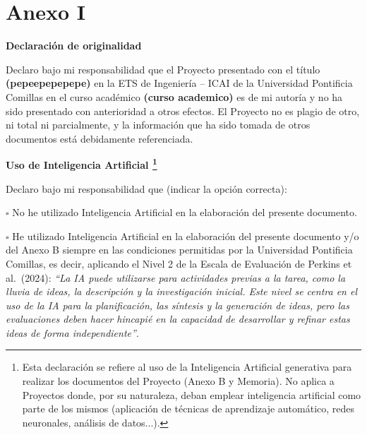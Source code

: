 \cleardoublepage
\chapter*{Anexo I}

\begin{center}
{\Large\bfseries Declaración de originalidad}
\end{center}

\vspace{0.8cm}

\noindent
Declaro bajo mi responsabilidad que el Proyecto presentado con el título \textbf{(pepeepepepepe)} en la ETS de Ingeniería -- ICAI de la Universidad Pontificia Comillas en el curso académico \textbf{(curso academico)} es de mi autoría y no ha sido presentado con anterioridad a otros efectos. El Proyecto no es plagio de otro, ni total ni parcialmente, y la información que ha sido tomada de otros documentos está debidamente referenciada.

\vspace{1.2cm}

\begin{center}
{\Large\bfseries Uso de Inteligencia Artificial \footnote{Esta declaración se refiere al uso de la Inteligencia Artificial generativa para realizar los documentos del Proyecto (Anexo B y Memoria). No aplica a Proyectos donde, por su naturaleza, deban emplear inteligencia artificial como parte de los mismos (aplicación de técnicas de aprendizaje automático, redes neuronales, análisis de datos...).}}
\end{center}

\vspace{0.8cm}

\noindent
Declaro bajo mi responsabilidad que (indicar la opción correcta):

\vspace{0.6cm}

\noindent
$\square$ \quad No he utilizado Inteligencia Artificial en la elaboración del presente documento.

\vspace{0.6cm}

\noindent
$\square$ \quad He utilizado Inteligencia Artificial en la elaboración del presente documento y/o del Anexo B siempre en las condiciones permitidas por la Universidad Pontificia Comillas, es decir, aplicando el Nivel 2 de la Escala de Evaluación de Perkins et al.\ (2024): \textit{``La IA puede utilizarse para actividades previas a la tarea, como la lluvia de ideas, la descripción y la investigación inicial. Este nivel se centra en el uso de la IA para la planificación, las síntesis y la generación de ideas, pero las evaluaciones deben hacer hincapié en la capacidad de desarrollar y refinar estas ideas de forma independiente''}.

